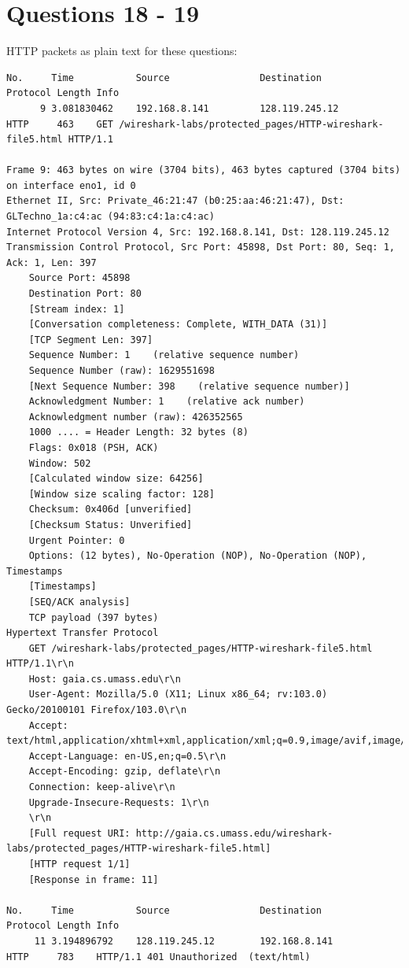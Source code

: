 \documentclass[a4paper,11pt,final]{report}
\begin{document}
\chapter{Questions 18 - 19}

HTTP packets as plain text for these questions:
\begin{lstlisting}[breaklines]
No.     Time           Source                Destination           Protocol Length Info
      9 3.081830462    192.168.8.141         128.119.245.12        HTTP     463    GET /wireshark-labs/protected_pages/HTTP-wireshark-file5.html HTTP/1.1 

Frame 9: 463 bytes on wire (3704 bits), 463 bytes captured (3704 bits) on interface eno1, id 0
Ethernet II, Src: Private_46:21:47 (b0:25:aa:46:21:47), Dst: GLTechno_1a:c4:ac (94:83:c4:1a:c4:ac)
Internet Protocol Version 4, Src: 192.168.8.141, Dst: 128.119.245.12
Transmission Control Protocol, Src Port: 45898, Dst Port: 80, Seq: 1, Ack: 1, Len: 397
    Source Port: 45898
    Destination Port: 80
    [Stream index: 1]
    [Conversation completeness: Complete, WITH_DATA (31)]
    [TCP Segment Len: 397]
    Sequence Number: 1    (relative sequence number)
    Sequence Number (raw): 1629551698
    [Next Sequence Number: 398    (relative sequence number)]
    Acknowledgment Number: 1    (relative ack number)
    Acknowledgment number (raw): 426352565
    1000 .... = Header Length: 32 bytes (8)
    Flags: 0x018 (PSH, ACK)
    Window: 502
    [Calculated window size: 64256]
    [Window size scaling factor: 128]
    Checksum: 0x406d [unverified]
    [Checksum Status: Unverified]
    Urgent Pointer: 0
    Options: (12 bytes), No-Operation (NOP), No-Operation (NOP), Timestamps
    [Timestamps]
    [SEQ/ACK analysis]
    TCP payload (397 bytes)
Hypertext Transfer Protocol
    GET /wireshark-labs/protected_pages/HTTP-wireshark-file5.html HTTP/1.1\r\n
    Host: gaia.cs.umass.edu\r\n
    User-Agent: Mozilla/5.0 (X11; Linux x86_64; rv:103.0) Gecko/20100101 Firefox/103.0\r\n
    Accept: text/html,application/xhtml+xml,application/xml;q=0.9,image/avif,image/webp,*/*;q=0.8\r\n
    Accept-Language: en-US,en;q=0.5\r\n
    Accept-Encoding: gzip, deflate\r\n
    Connection: keep-alive\r\n
    Upgrade-Insecure-Requests: 1\r\n
    \r\n
    [Full request URI: http://gaia.cs.umass.edu/wireshark-labs/protected_pages/HTTP-wireshark-file5.html]
    [HTTP request 1/1]
    [Response in frame: 11]

No.     Time           Source                Destination           Protocol Length Info
     11 3.194896792    128.119.245.12        192.168.8.141         HTTP     783    HTTP/1.1 401 Unauthorized  (text/html)


\end{lstlisting}
\end{document}
